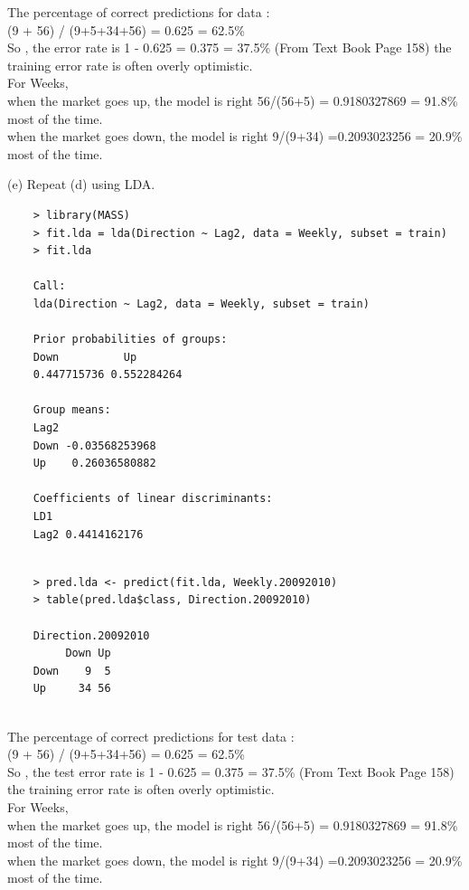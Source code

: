 \documentclass{article}
\begin{document}
The percentage of correct predictions for  data : \\
(9 + 56) / (9+5+34+56) = 0.625 = 62.5\% \\
So , the error rate is 1 - 0.625 = 0.375 = 37.5\%  (From  Text Book Page 158)  the training error rate is often overly optimistic.\\

For Weeks, \\
when the market goes up, the model is right 56/(56+5) = 0.9180327869 = 91.8\% most of the time. \\
when the market goes down, the model is right 9/(9+34) =0.2093023256 = 20.9\% most of the time. 

\newpage
(e) Repeat (d) using LDA.

\begin{program}
	\begin{verbatim}
	> library(MASS)
	> fit.lda = lda(Direction ~ Lag2, data = Weekly, subset = train) 
	> fit.lda
	
	Call:
	lda(Direction ~ Lag2, data = Weekly, subset = train)
	
	Prior probabilities of groups:
	Down          Up 
	0.447715736 0.552284264 
	
	Group means:
	Lag2
	Down -0.03568253968
	Up    0.26036580882
	
	Coefficients of linear discriminants:
	LD1
	Lag2 0.4414162176
	
	\end{verbatim}
\end{program}

\begin{program}
	\begin{verbatim}
	> pred.lda <- predict(fit.lda, Weekly.20092010)
	> table(pred.lda$class, Direction.20092010)
	
	Direction.20092010
	     Down Up
	Down    9  5
	Up     34 56
	
	\end{verbatim}
\end{program}

The percentage of correct predictions for test data : \\
(9 + 56) / (9+5+34+56) = 0.625 = 62.5\% \\
So , the test error rate is 1 - 0.625 = 0.375 = 37.5\%  (From  Text Book Page 158)  the training error rate is often overly optimistic.\\

For Weeks, \\
when the market goes up, the model is right 56/(56+5) = 0.9180327869 = 91.8\% most of the time. \\
when the market goes down, the model is right 9/(9+34) =0.2093023256 = 20.9\% most of the time. 
\end{document}
